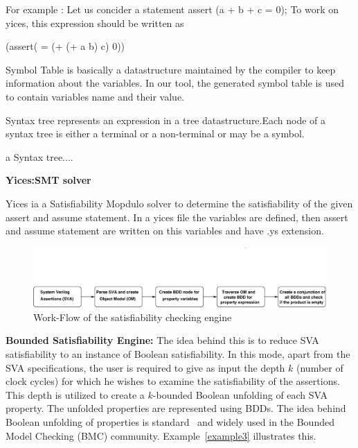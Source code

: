 \documentclass{svmult}
\begin{document}
For example : Let us concider a statement assert (a + b + c = 0);
              To work on yices, this expression should be written as
               
                 (assert( = (+ (+ a b) c) 0))
                 
Symbol Table is basically a datastructure maintained by the compiler to keep information
about the variables. In our tool, the generated symbol table is used to contain variables 
name and their value.

Syntax tree represents an expression in a tree datastructure.Each node of a syntax tree 
is either a terminal or a non-terminal or may be a symbol.
                 
                 
a Syntax tree....



\noindent
{\bf Yices:SMT solver} 

Yices ia a Satisfiability Mopdulo solver to determine the satisfiability of the given assert 
and assume statement. In a yices file the variables are defined, then assert and assume statement
are written on this variables and have .ys extension. 




\begin{figure}[!h]
\includegraphics[scale=0.45]{fig1.eps}
\caption{Work-Flow of the satisfiability checking engine} \label{fig1}
\end{figure}

\noindent
{\bf Bounded Satisfiability Engine:} The idea behind this is to 
reduce SVA satisfiability to an instance of Boolean satisfiability. In 
this mode, apart from the SVA specifications, the user is required to give 
as input the depth $k$ (number of clock cycles) for which he wishes to examine 
the satisfiability of the assertions. This depth is utilized to create a 
$k$-bounded Boolean unfolding of each SVA property. The unfolded properties 
are represented using BDDs. The idea behind Boolean unfolding of properties is 
standard~\cite{roadmap} and widely used in the Bounded Model Checking 
(BMC) community. Example~\ref{example3} illustrates this.
\end{document}
